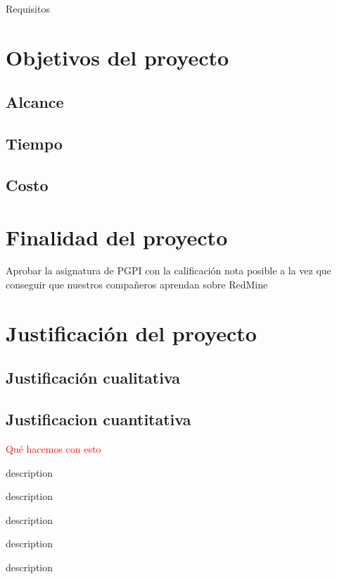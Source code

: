 \documentclass[a4paper,10pt]{scrartcl}
\begin{document}
		Requisitos
		
		
\section{Objetivos del proyecto}
\subsection{Alcance}


\subsection{Tiempo}		
		
		
\subsection{Costo}



\section{Finalidad del proyecto}

	Aprobar la asignatura de PGPI con la calificación nota posible a la vez que conseguir que nuestros compañeros aprendan sobre RedMine
	
\section{Justificación del proyecto}
\subsection{Justificación cualitativa}

\subsection{Justificacion cuantitativa}
\textcolor{red} {Qué hacemos con esto}


\begin{description}[align=right, labelwidth=4cm]
	\item [Flujo de ingresos] description
	\item [Flujo de egresos] description
	\item [VAN] description
	\item [TIR] description
	\item [RBC] description
\end{description}
\end{document}
